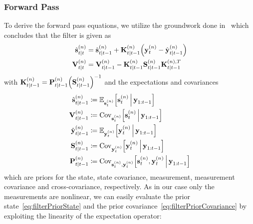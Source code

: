 		\subsubsection{Forward Pass}
			To derive the forward pass equations, we utilize the groundwork done in~\cite{deisenrothProbabilisticPerspectiveGaussian2011} which concludes that the filter is given as
			\begin{align*}
				\hat{\boldsymbol{\mathrm{s}}}_{t \vert t}^{(n)} &= \hat{\boldsymbol{\mathrm{s}}}_{t \vert t - 1}^{(n)} + \boldsymbol{\mathrm{K}}_{t \vert t - 1}^{(n)} \Big(\boldsymbol{\mathrm{y}}_t^{(n)} - \hat{\boldsymbol{\mathrm{y}}}_{t \vert t - 1}^{(n)}\Big) \\
				\boldsymbol{\mathrm{V}}_{t \vert t}^{(n)}       &= \boldsymbol{\mathrm{V}}_{t \vert t - 1}^{(n)} - \boldsymbol{\mathrm{K}}_{t \vert t - 1}^{(n)} \boldsymbol{\mathrm{S}}_{t \vert t - 1}^{(n)} \boldsymbol{\mathrm{K}}_{t \vert t - 1}^{(n), T}
			\end{align*}
			with \( \boldsymbol{\mathrm{K}}_{t \vert t - 1}^{(n)} = \boldsymbol{\mathrm{P}}_{t \vert t - 1}^{(n)} \Big(\boldsymbol{\mathrm{S}}_{t \vert t - 1}^{(n)}\Big)^{-1} \) and the expectations and covariances
			\begin{align}
				\hat{\boldsymbol{\mathrm{s}}}_{t \vert t - 1}^{(n)} &\coloneqq \mathbb{E}_{\boldsymbol{\mathrm{s}}_t^{(n)}}\Big[\boldsymbol{\mathrm{s}}_t^{(n)} \,\Big\vert\, \boldsymbol{\mathrm{y}}_{1:t - 1}\Big]  \label{eq:filterPriorState} \\
				\boldsymbol{\mathrm{V}}_{t \vert t - 1}^{(n)}       &\coloneqq \operatorname{Cov}_{\boldsymbol{\mathrm{s}}_t^{(n)}}\!\Big[\boldsymbol{\mathrm{s}}_t^{(n)} \,\Big\vert\, \boldsymbol{\mathrm{y}}_{1:t - 1}\Big]  \label{eq:filterPriorCovariance} \\
				\hat{\boldsymbol{\mathrm{y}}}_{t \vert t - 1}^{(n)} &\coloneqq \mathbb{E}_{\boldsymbol{\mathrm{y}}_t^{(n)}}\Big[\boldsymbol{\mathrm{y}}_t^{(n)} \,\Big\vert\, \boldsymbol{\mathrm{y}}_{1:t - 1}\Big]  \label{eq:filterPriorMeas} \\
				\boldsymbol{\mathrm{S}}_{t \vert t - 1}^{(n)}       &\coloneqq \operatorname{Cov}_{\boldsymbol{\mathrm{y}}_t^{(n)}}\!\Big[\boldsymbol{\mathrm{y}}_t^{(n)} \,\Big\vert\, \boldsymbol{\mathrm{y}}_{1:t - 1}\Big]  \label{eq:filterPriorMeasCov} \\
				\boldsymbol{\mathrm{P}}_{t \vert t - 1}^{(n)}       &\coloneqq \operatorname{Cov}_{\boldsymbol{\mathrm{s}}_t^{(n)}, \boldsymbol{\mathrm{y}}_t^{(n)}}\!\Big[\boldsymbol{\mathrm{s}}_t^{(n)}, \boldsymbol{\mathrm{y}}_t^{(n)} \,\Big\vert\, \boldsymbol{\mathrm{y}}_{1:t - 1}\Big]  \label{eq:filterPriorKalman}
			\end{align}
			which are priors for the state, state covariance, measurement, measurement covariance and cross-covariance, respectively. As in our case only the measurements are nonlinear, we can easily evaluate the prior state~\eqref{eq:filterPriorState} and the prior covariance~\eqref{eq:filterPriorCovariance} by exploiting the linearity of the expectation operator:

